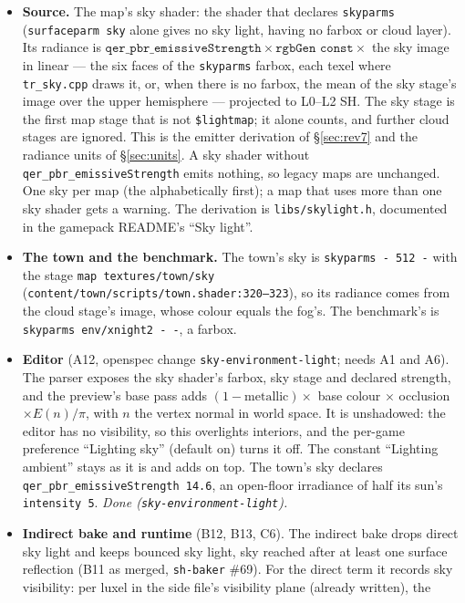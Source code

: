 \documentclass[11pt,a4paper]{article}
\begin{document}
\begin{itemize}
\item \textbf{Source.} The map's sky shader: the shader that declares \texttt{skyparms}
  (\texttt{surfaceparm sky} alone gives no sky light, having no farbox or cloud layer). Its radiance
  is $\texttt{qer\_pbr\_emissiveStrength} \times \texttt{rgbGen const} \times$ the sky image in
  linear --- the six faces of the \texttt{skyparms} farbox, each texel where \texttt{tr\_sky.cpp}
  draws it, or, when there is no farbox, the mean of the sky stage's image over the upper
  hemisphere --- projected to L0--L2 SH. The sky stage is the first map stage that is not
  \texttt{\$lightmap}; it alone counts, and further cloud stages are ignored. This is the emitter
  derivation of §\ref{sec:rev7} and the radiance units of §\ref{sec:units}. A sky shader without
  \texttt{qer\_pbr\_emissiveStrength} emits nothing, so legacy maps are unchanged. One sky per map
  (the alphabetically first); a map that uses more than one sky shader gets a warning. The
  derivation is \texttt{libs/skylight.h}, documented in the gamepack README's ``Sky light''.
\item \textbf{The town and the benchmark.} The town's sky is \texttt{skyparms - 512 -} with the
  stage \texttt{map textures/town/sky} (\texttt{content/town/scripts/town.shader:320--323}), so its
  radiance comes from the cloud stage's image, whose colour equals the fog's. The benchmark's is
  \texttt{skyparms env/xnight2 - -}, a farbox.
\item \textbf{Editor} (A12, openspec change \texttt{sky-environment-light}; needs A1 and A6).
  The parser exposes the sky shader's farbox, sky stage and declared strength, and the preview's
  base pass adds $(1 - \textrm{metallic}) \times$ base colour $\times$ occlusion $\times E(n)/\pi$,
  with $n$ the vertex normal in world space. It is unshadowed: the editor has no visibility, so this
  overlights interiors, and the per-game preference ``Lighting sky'' (default on) turns it off. The
  constant ``Lighting ambient'' stays as it is and adds on top. The town's sky declares
  \texttt{qer\_pbr\_emissiveStrength 14.6}, an open-floor irradiance of half its sun's
  \texttt{intensity 5}. \emph{Done (\texttt{sky-environment-light}).}
\item \textbf{Indirect bake and runtime} (B12, B13, C6). The indirect bake drops direct sky light
  and keeps bounced sky light, sky reached after at least one surface reflection (B11 as merged,
  \texttt{sh-baker} \#69). For the direct term it records sky visibility: per luxel in the side file's visibility plane (already written), the

\end{itemize}
\end{document}

